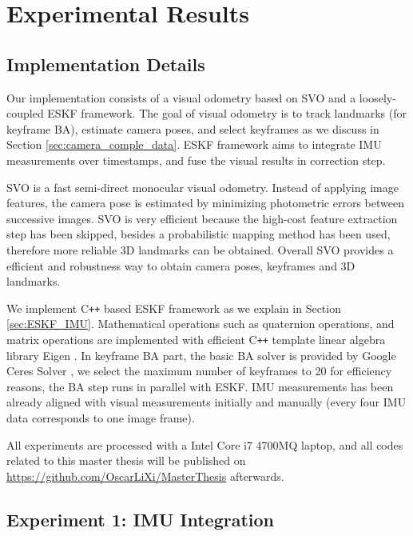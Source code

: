 \section{Experimental Results}
\label{sec:experiment}

\subsection{Implementation Details}
\label{subsec:imple_detail}

Our implementation consists of a visual odometry based on SVO \cite{forster2014svo} and a loosely-coupled ESKF framework. The goal of visual odometry is to track landmarks (for keyframe BA), estimate camera poses, and select keyframes as we discuss in Section \ref{sec:camera_comple_data}. ESKF framework aims to integrate IMU measurements over timestamps, and fuse the visual results in correction step.

SVO \cite{forster2014svo} is a fast semi-direct monocular visual odometry. Instead of applying image features, the camera pose is estimated by minimizing photometric errors between successive images. SVO is very efficient because the high-cost feature extraction step has been skipped, besides a probabilistic mapping method has been used, therefore more reliable 3D landmarks can be obtained. Overall SVO provides a efficient and robustness way to obtain camera poses, keyframes and 3D landmarks. 

We implement C\texttt{++} based ESKF framework as we explain in Section \ref{sec:ESKF_IMU}. Mathematical operations such as quaternion operations, and matrix operations are implemented with efficient C\texttt{++} template linear algebra library Eigen \cite{eigenweb}. In keyframe BA part, the basic BA solver is provided by Google Ceres Solver \cite{ceres-solver}, we select the maximum number of keyframes to 20 for efficiency reasons, the BA step runs in parallel with ESKF. IMU measurements has been already aligned with visual measurements initially and manually (every four IMU data corresponds to one image frame).

All experiments are processed with a Intel Core i7 4700MQ laptop, and all codes related to this master thesis will be published on \url{https://github.com/OscarLiXi/MasterThesis} afterwards.

\subsection{Experiment 1: IMU Integration}
\label{subsec:experiment1}

